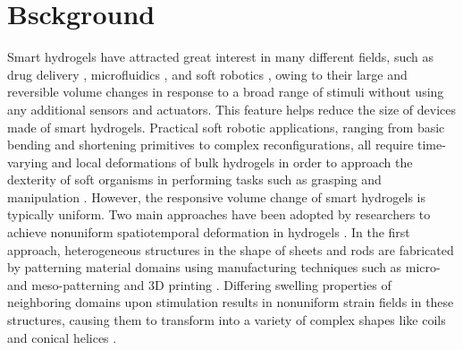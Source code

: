 \section{Bsckground}
Smart hydrogels have attracted great interest in many different fields, such as drug delivery ,               
microfluidics , and soft robotics , owing to their large and reversible volume changes in response to a broad range of stimuli without using any additional sensors and actuators. This feature helps reduce the size of devices made of smart hydrogels. 
Practical soft robotic applications, ranging from basic bending and shortening primitives to complex reconfigurations, all require time-varying and local deformations of bulk hydrogels in order to approach the dexterity of 
soft organisms in performing tasks such as grasping and manipulation .
However, the responsive volume change of smart hydrogels is typically uniform.
Two main approaches have been adopted by researchers to achieve nonuniform spatiotemporal deformation in hydrogels . In the first approach, heterogeneous structures in the shape of sheets and rods are fabricated by patterning material domains using manufacturing techniques such as micro- and meso-patterning  and 3D printing . Differing swelling properties of neighboring domains upon stimulation results in nonuniform strain fields in these structures, causing them to transform into a variety of complex shapes like coils and conical helices .
